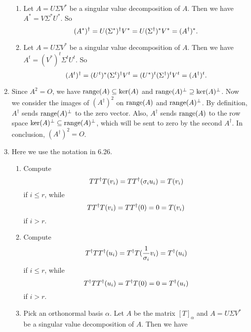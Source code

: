 \begin{enumerate}
\begin{enumerate}
\item Let $A=U\Sigma V^*$ be a singular value decomposition of $A$. Then we have $A^*=V\Sigma ^* U^*$. So 
\[(A^*)^{\dagger}=U(\Sigma^*)^{\dagger} V^*=U(\Sigma^{\dagger} )^*V^*=(A^{\dagger})^*.\]
\item Let $A=U\Sigma V^*$ be a singular value decomposition of $A$. Then we have $A^t=(V^*)^t \Sigma ^t U^t$. So 
\[(A^t)^{\dagger}=(U^t)^*(\Sigma^t)^{\dagger} V^t=(U^*)^t(\Sigma^{\dagger} )^tV^t=(A^{\dagger})^t.\]
\end{enumerate}
\item Since $A^2 = O$, we have $\operatorname{range}(A) \subseteq \ker(A)$ and $\operatorname{range}(A)^\perp \supseteq \ker(A)^\perp$.  Now we consider the images of $(A^\dagger)^2$ on $\operatorname{range}(A)$ and $\operatorname{range}(A)^\perp$.  By definition, $A^\dagger$ sends $\operatorname{range}(A)^\perp$ to the zero vector.  Also, $A^\dagger$ sends $\operatorname{range}(A)$ to the row space $\ker(A)^\perp \subseteq \operatorname{range}(A)^\perp$, which will be sent to zero by the second $A^\dagger$.  In conclusion, $(A^\dagger)^2 = O$.
\item Here we use the notation in 6.26. \begin{enumerate}
\item Compute 
\[TT^{\dagger} T(v_i)=TT^{\dagger}(\sigma_iu_i)=T(v_i)\]
if $i\leq r$, while 
\[TT^{\dagger} T(v_i)=TT^{\dagger}(0)=0=T(v_i)\]
if $i>r$.
\item Compute 
\[T^{\dagger} TT^{\dagger}(u_i)=T^{\dagger} T(\frac{1}{\sigma_i}v_i)=T^{\dagger} (u_i)\]
if $i\leq r$, while 
\[T^{\dagger} TT^{\dagger} (u_i)=T^{\dagger} T(0)=0=T^{\dagger} (u_i)\]
if $i>r$.
\item Pick an orthonormal basis $\alpha $. Let $A$ be the matrix $[T]_{\alpha}$ and $A=U\Sigma V^*$ be a singular value decomposition of $A$. Then we have 

\end{enumerate}
\end{enumerate}
